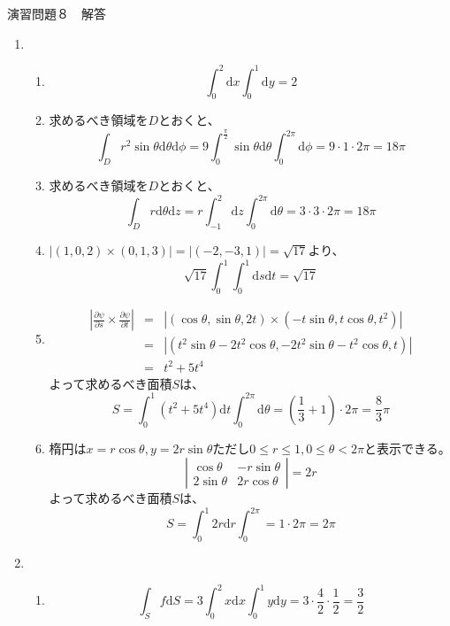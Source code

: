 \documentclass{jarticle}
\def\d{\mathrm d}
\begin{document}
\begin{center} {\Large 演習問題８　解答} \end{center}
\begin{enumerate}
  \item
    \begin{enumerate}
      \item
        \[ \int_0^2 \d x \int_0^1 \d y = 2 \]
      \item
        求めるべき領域を$D$とおくと、
        \[ \int_D r^2 \sin \theta \d \theta \d \phi = 9 \int_0^{\frac{\pi}{2}} \sin \theta \d \theta \int_0^{2\pi} \d \phi = 9 \cdot 1 \cdot 2 \pi = 18 \pi \]
      \item
        求めるべき領域を$D$とおくと、
        \[ \int_D r \d \theta \d z = r \int_{-1}^2 \d z \int_0^{2\pi} \d \theta = 3 \cdot 3 \cdot 2 \pi = 18 \pi \]
      \item
        $|(1,0,2) \times (0,1,3)| = |(-2,-3,1)| = \sqrt{17}$より、
        \[ \sqrt{17} \int_0^1 \int_0^1 \d s \d t = \sqrt{17} \]
      \item
        \begin{eqnarray*}
        \left|\frac{\partial \psi}{\partial s} \times \frac{\partial \psi}{\partial t} \right| & = & \left| (\cos\theta,\sin\theta,2t) \times (-t\sin\theta,t\cos\theta,t^2)\right| \\
        & = & \left| (t^2\sin\theta-2t^2\cos\theta,-2t^2\sin\theta-t^2\cos\theta,t) \right| \\
        & = & t^2+5t^4
        \end{eqnarray*}
        よって求めるべき面積$S$は、
        \[ S = \int_0^1 ( t^2 + 5t^4 ) \d t \int_0^{2\pi} \d \theta = \left( \frac{1}{3}+1 \right) \cdot 2\pi = \frac{8}{3} \pi \]
      \item
        楕円は$x=r\cos\theta,y=2r\sin\theta$ただし$0 \leq r \leq 1, 0 \leq \theta < 2\pi$と表示できる。
        \[ 
          \left| \begin{array}{cc}
            \cos\theta & -r\sin\theta \\
            2\sin\theta & 2r\cos\theta
          \end{array} \right| = 2r
        \]
        よって求めるべき面積$S$は、
        \[
          S = \int_0^1 2r \d r \int_0^{2\pi} = 1 \cdot 2\pi = 2\pi
        \]
    \end{enumerate}
  \item
    \begin{enumerate}
      \item
        \[ \int_S f \d S = 3 \int_0^2 x \d x \int_0^1 y \d y = 3 \cdot \frac{4}{2} \cdot \frac{1}{2} = \frac{3}{2} \]

\end{enumerate}
\end{enumerate}
\end{document}
